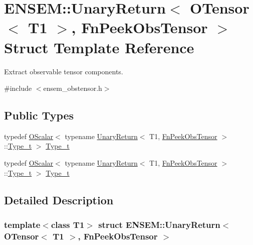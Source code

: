 \hypertarget{structENSEM_1_1UnaryReturn_3_01OTensor_3_01T1_01_4_00_01FnPeekObsTensor_01_4}{}\section{E\+N\+S\+EM\+:\+:Unary\+Return$<$ O\+Tensor$<$ T1 $>$, Fn\+Peek\+Obs\+Tensor $>$ Struct Template Reference}
\label{structENSEM_1_1UnaryReturn_3_01OTensor_3_01T1_01_4_00_01FnPeekObsTensor_01_4}


Extract observable tensor components.  




{\ttfamily \#include $<$ensem\+\_\+obstensor.\+h$>$}

\subsection*{Public Types}
\begin{DoxyCompactItemize}
\item 
typedef \mbox{\hyperlink{classENSEM_1_1OScalar}{O\+Scalar}}$<$ typename \mbox{\hyperlink{structENSEM_1_1UnaryReturn}{Unary\+Return}}$<$ T1, \mbox{\hyperlink{structENSEM_1_1FnPeekObsTensor}{Fn\+Peek\+Obs\+Tensor}} $>$\+::\mbox{\hyperlink{structENSEM_1_1UnaryReturn_3_01OTensor_3_01T1_01_4_00_01FnPeekObsTensor_01_4_abefeb4103abe844c4b6cbc2df22fd844}{Type\+\_\+t}} $>$ \mbox{\hyperlink{structENSEM_1_1UnaryReturn_3_01OTensor_3_01T1_01_4_00_01FnPeekObsTensor_01_4_abefeb4103abe844c4b6cbc2df22fd844}{Type\+\_\+t}}
\item 
typedef \mbox{\hyperlink{classENSEM_1_1OScalar}{O\+Scalar}}$<$ typename \mbox{\hyperlink{structENSEM_1_1UnaryReturn}{Unary\+Return}}$<$ T1, \mbox{\hyperlink{structENSEM_1_1FnPeekObsTensor}{Fn\+Peek\+Obs\+Tensor}} $>$\+::\mbox{\hyperlink{structENSEM_1_1UnaryReturn_3_01OTensor_3_01T1_01_4_00_01FnPeekObsTensor_01_4_abefeb4103abe844c4b6cbc2df22fd844}{Type\+\_\+t}} $>$ \mbox{\hyperlink{structENSEM_1_1UnaryReturn_3_01OTensor_3_01T1_01_4_00_01FnPeekObsTensor_01_4_abefeb4103abe844c4b6cbc2df22fd844}{Type\+\_\+t}}
\end{DoxyCompactItemize}


\subsection{Detailed Description}
\subsubsection*{template$<$class T1$>$\newline
struct E\+N\+S\+E\+M\+::\+Unary\+Return$<$ O\+Tensor$<$ T1 $>$, Fn\+Peek\+Obs\+Tensor $>$}

